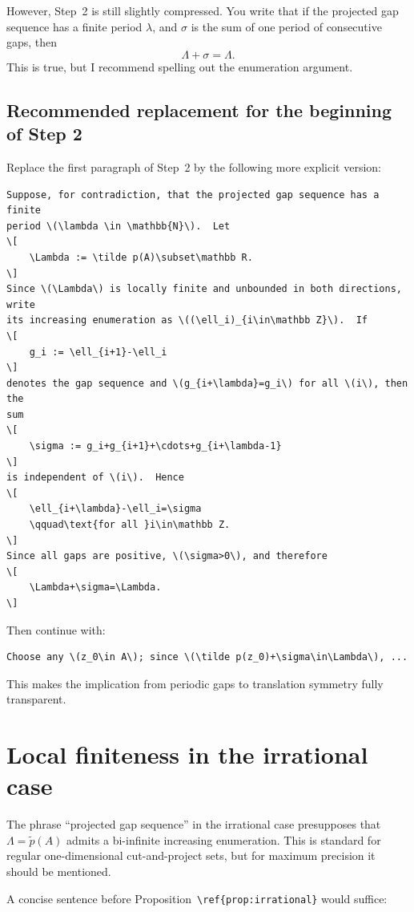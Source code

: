 \documentclass[11pt]{article}
\begin{document}
However, Step~2 is still slightly compressed.  You write that if the projected
gap sequence has a finite period \(\lambda\), and \(\sigma\) is the sum of one
period of consecutive gaps, then
\[
    \Lambda+\sigma=\Lambda.
\]
This is true, but I recommend spelling out the enumeration argument.

\subsection*{Recommended replacement for the beginning of Step 2}

Replace the first paragraph of Step~2 by the following more explicit version:

\begin{lstlisting}
Suppose, for contradiction, that the projected gap sequence has a finite
period \(\lambda \in \mathbb{N}\).  Let
\[
    \Lambda := \tilde p(A)\subset\mathbb R.
\]
Since \(\Lambda\) is locally finite and unbounded in both directions, write
its increasing enumeration as \((\ell_i)_{i\in\mathbb Z}\).  If
\[
    g_i := \ell_{i+1}-\ell_i
\]
denotes the gap sequence and \(g_{i+\lambda}=g_i\) for all \(i\), then the
sum
\[
    \sigma := g_i+g_{i+1}+\cdots+g_{i+\lambda-1}
\]
is independent of \(i\).  Hence
\[
    \ell_{i+\lambda}-\ell_i=\sigma
    \qquad\text{for all }i\in\mathbb Z.
\]
Since all gaps are positive, \(\sigma>0\), and therefore
\[
    \Lambda+\sigma=\Lambda.
\]
\end{lstlisting}

Then continue with:

\begin{lstlisting}
Choose any \(z_0\in A\); since \(\tilde p(z_0)+\sigma\in\Lambda\), ...
\end{lstlisting}

This makes the implication from periodic gaps to translation symmetry fully
transparent.

\section{Local finiteness in the irrational case}

The phrase ``projected gap sequence'' in the irrational case presupposes that
\(\Lambda=\tilde p(A)\) admits a bi-infinite increasing enumeration.  This is
standard for regular one-dimensional cut-and-project sets, but for maximum
precision it should be mentioned.

A concise sentence before Proposition~\texttt{\textbackslash ref\{prop:irrational\}}
would suffice:
\end{document}

